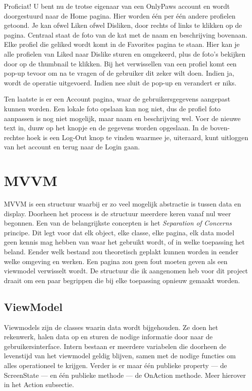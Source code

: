 \documentclass{article}
\begin{document}
Proficiat! U bent nu de trotse eigenaar van een OnlyPaws account en wordt doorgestuurd naar de Home pagina.
Hier worden één per één andere profielen getoond. Je kan ofwel Liken ofwel Disliken, door rechts of links te klikken op de pagina. 
Centraal staat de foto van de kat met de naam en beschrijving bovenaan.
Elke profiel die geliked wordt komt in de Favorites pagina te staan. Hier kan je alle profielen van Liked naar Dislike sturen en omgekeerd, plus de foto's bekijken door op de thumbnail te klikken.
Bij het verwissellen van een profiel komt een pop-up tevoor om na te vragen of de gebruiker dit zeker wilt doen. Indien ja, wordt de operatie uitgevoerd. Indien nee sluit de pop-up en verandert er niks.

Ten laatste is er een Account pagina, waar de gebruikersgegevens aangepast kunnen worden. Een lokale foto opslaan kan nog niet, dus de profiel foto aanpassen is nog niet mogelijk, maar naam en beschrijving wel.
Voer de nieuwe text in, duuw op het knopje en de gegevens worden opgeslaan.
In de boven-rechtse hoek is een Log-Out knop te vinden waarmee je, uiteraard, kunt uitloggen van het account en terug naar de Login gaan.


\section{MVVM}
MVVM is een structuur waarbij er zo veel mogelijk abstractie is tussen data en display. Doorheen het process is de structuur meerdere keren vanaf nul weer begonnen.
Een van de belangrijkste concepten is het \textit{Separation of Concerns} principe. Dit legt voor dat elk object, elke classe, elke pagina, elk data model geen kennis mag hebben van waar het gebruikt wordt, of in welke toepassing het beland.
Eender welk bestand zou theoretisch geplakt kunnen worden in eender welke omgeving en werken. Een pagina zou geen fout moeten geven als een viewmodel verwisselt wordt.
De structuur die ik aangenomen heb voor dit project draait om een paar begrippen die bij elke toepassing opnieuw gemaakt worden.


\subsection{ViewModel}
Viewmodels zijn de classes waarin data wordt bijgehouden. Ze doen het rekenwerk, halen data op en sturen de nodige informatie door naar de gebruikersinterface.
Intern bestaan er meerdere variabelen die doorheen de levenstijd van het viewmodel geldig blijven, samen met de nodige functies om alles operationeel te krijgen.
Verder is er maar één publieke property --- de ScreenState --- en één publieke methode --- de OnAction methode. Meer hierover in het Action subsectie.
\end{document}
